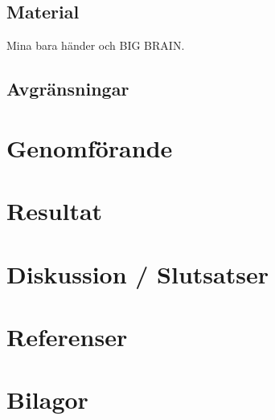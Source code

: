 \documentclass{article}
\begin{document}

\subsection{Material}

Mina bara händer och BIG BRAIN.

\subsection{Avgränsningar}

\section{Genomförande}

\section{Resultat}

\section{Diskussion / Slutsatser}

\section{Referenser}

\section{Bilagor}
\end{document}
